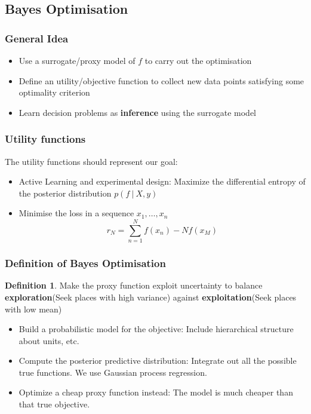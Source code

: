 \documentclass{article}
\theoremstyle{definition}
\newtheorem{definition}{Definition}[section]
\begin{document}
\subsection{Bayes Optimisation}
\subsubsection{General Idea}
\begin{itemize}
    \item Use a surrogate/proxy model of $f$ to carry out the optimisation
    \item Define an utility/objective function to collect new data points satisfying some optimality criterion
    \item Learn decision problems as \textbf{inference} using the surrogate model
\end{itemize}

\subsubsection{Utility functions}
The utility functions should represent our goal:
\begin{itemize}
    \item Active Learning and experimental design: Maximize the differential entropy of the posterior distribution $p(f \ | \ X, y)$
    \item Minimise the loss in a sequence $x_1, \dots, x_n$
    \[ r_N = \sum^N_{n=1} f(x_n) - N f(x_M) \]
\end{itemize}

\subsubsection{Definition of Bayes Optimisation}
\begin{definition}
Make the proxy function exploit uncertainty to balance \textbf{exploration}(Seek places with high variance) against \textbf{exploitation}(Seek places with low mean)
\end{definition}

\begin{itemize}
    \item Build a probabilistic model for the objective: Include hierarchical structure about units, etc.
    \item Compute the posterior predictive distribution: Integrate out all the possible true functions. We use Gaussian process regression.
    \item Optimize a cheap proxy function instead: The model is much cheaper than that true objective.
\end{itemize}
\end{document}
